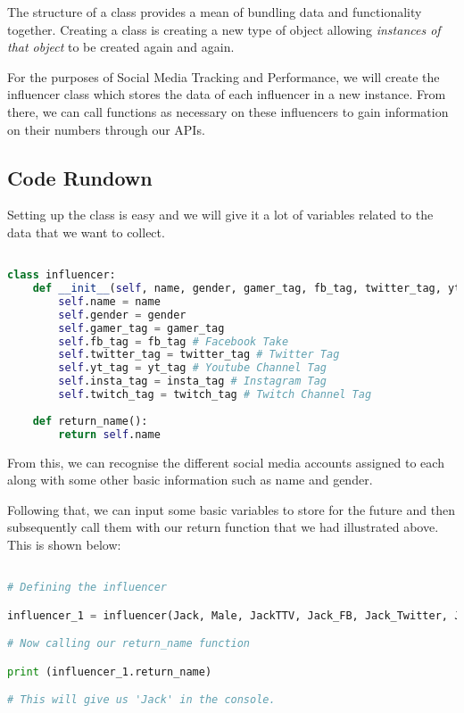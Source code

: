 \documentclass[12pt, letterpaper]{article}
\begin{document}
The structure of a class provides a mean of bundling data and functionality together. Creating a class is creating a new type of object allowing \textit{instances of that object} to be created again and again.

For the purposes of Social Media Tracking and Performance, we will create the influencer class which stores the data of each influencer in a new instance. From there, we can call functions as necessary on these influencers to gain information on their numbers through our APIs.

\subsection{Code Rundown}
Setting up the class is easy and we will give it a lot of variables related to the data that we want to collect.

\begin{lstlisting}[language=python]

class influencer:
	def __init__(self, name, gender, gamer_tag, fb_tag, twitter_tag, yt_tag, insta_tag, twitch_tag):
		self.name = name
		self.gender = gender
		self.gamer_tag = gamer_tag
		self.fb_tag = fb_tag # Facebook Take
		self.twitter_tag = twitter_tag # Twitter Tag
		self.yt_tag = yt_tag # Youtube Channel Tag
		self.insta_tag = insta_tag # Instagram Tag
		self.twitch_tag = twitch_tag # Twitch Channel Tag
	
	def return_name():
		return self.name

\end{lstlisting}

From this, we can recognise the different social media accounts assigned to each along with some other basic information such as name and gender.

Following that, we can input some basic variables to store for the future and then subsequently call them with our return function that we had illustrated above. This is shown below:

\begin{lstlisting}[language=python]

# Defining the influencer

influencer_1 = influencer(Jack, Male, JackTTV, Jack_FB, Jack_Twitter, Jack_YT, Jack_Insta, Jack_Twitch)

# Now calling our return_name function

print (influencer_1.return_name)

# This will give us 'Jack' in the console.

\end{lstlisting}
\end{document}
